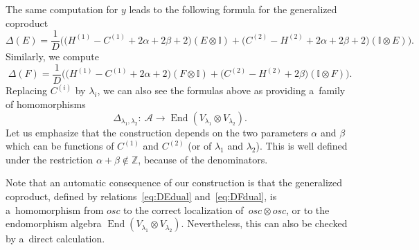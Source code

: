 \documentclass[pdftex]{sigma}
\numberwithin{equation}{section}
\theoremstyle{definition}
\begin{document}
The same computation for $y$ leads to the following formula for the generalized coproduct
\begin{equation}\label{eq:DEdual}
 \Delta(E)=\frac{1}{D}\bigl(\bigl(H^{(1)} -C^{(1)}+2\alpha+2\beta+2\bigr)(E\otimes \mathbb{I})+\bigl(C^{(2)} -H^{(2)}+2\alpha+2\beta+2\bigr)(\mathbb{I}\otimes E)\bigr).
\end{equation}
Similarly, we compute
\begin{equation}\label{eq:DFdual}
\Delta(F)=\frac{1}{D}\bigl(\bigl(H^{(1)}-C^{(1)}+2\alpha+2\bigr)(F\otimes \mathbb{I})+\bigl(C^{(2)}-H^{(2)}+2\beta\bigr)(\mathbb{I}\otimes F)\bigr).\end{equation}
 Replacing $C^{(i)}$ by $\lambda_i$, we can also see the formulas above as providing a~family of homomorphisms
\[\Delta_{\lambda_1,\lambda_2}\colon\ \mathcal{A} \to \operatorname{End}(V_{\lambda_1}\otimes V_{\lambda_2}) .\]
Let us emphasize that the construction depends on the two parameters $\alpha$ and $\beta$ which can be functions of $C^{(1)}$ and $C^{(2)}$ (or of $\lambda_1$ and $\lambda_2$). This is well defined under the restriction $\alpha+\beta\notin\mathbb{Z}$, because of the denominators.

Note that an automatic consequence of our construction is that the generalized coproduct, defined by relations~\eqref{eq:DEdual} and~\eqref{eq:DFdual}, is a~homomorphism from $osc$ to the correct localization of~$osc \otimes osc$, or to the endomorphism algebra $\operatorname{End}(V_{\lambda_1}\otimes V_{\lambda_2})$. Nevertheless, this can also be checked by a~direct calculation.
\end{document}
